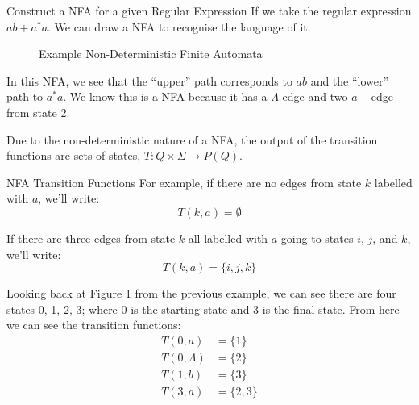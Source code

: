 \begin{example}{Construct a NFA for a given Regular Expression}
If we take the regular expression $ab + a^*a$. We can draw a NFA to recognise the language of it.

\begin{figure}[H]
    \centering
    \caption{Example Non-Deterministic Finite Automata}
    \label{fig:eg-nfa}
\end{figure}

In this NFA, we see that the ``upper'' path corresponds to $ab$ and the ``lower'' path to $a^*a$. We know this is a NFA because it has a $\Lambda$ edge and two $a-$edge from state 2.
\end{example}

Due to the non-deterministic nature of a NFA, the output of the transition functions are sets of states, $T:Q \times \Sigma \rightarrow P(Q)$. 

\begin{example}{NFA Transition Functions}
For example, if there are no edges from state $k$ labelled with $a$, we'll write:
\[T(k, a) = \emptyset\]

If there are three edges from state $k$ all labelled with $a$ going to states $i$, $j$, and $k$, we'll write:
\[T(k,a) = \{i, j, k\}\]

Looking back at Figure \ref{fig:eg-nfa} from the previous example, we can see there are four states 0, 1, 2, 3; where 0 is the starting state and 3 is the final state. From here we can see the transition functions:
\begin{align*}
T(0,a) &= \{1\}\\
T(0, \Lambda) &= \{2\}\\
T(1,b) &= \{3\}\\
T(3,a) &= \{2, 3\}
\end{align*}
\end{example}

